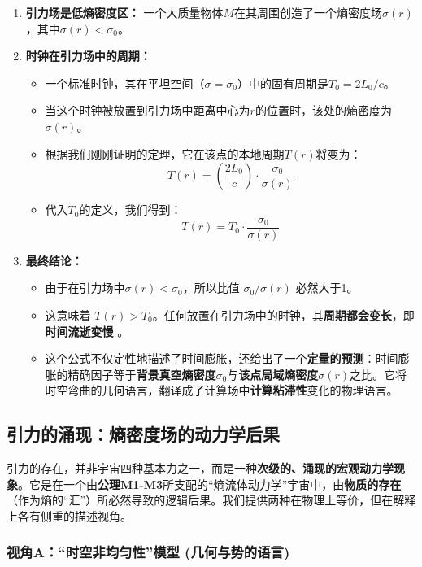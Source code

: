 \documentclass[11pt, a4paper]{article}
\begin{document}
\begin{enumerate}
    \item \textbf{引力场是低熵密度区：} 一个大质量物体$M$在其周围创造了一个熵密度场$\sigma(r)$，其中$\sigma(r) < \sigma_0$。
    \item \textbf{时钟在引力场中的周期：}
    \begin{itemize}
        \item 一个标准时钟，其在平坦空间（$\sigma=\sigma_0$）中的固有周期是$T_0 = 2L_0 / c$。
        \item 当这个时钟被放置到引力场中距离中心为$r$的位置时，该处的熵密度为$\sigma(r)$。
        \item 根据我们刚刚证明的定理，它在该点的本地周期$T(r)$将变为：
        \[
        T(r) = \left(\frac{2L_0}{c}\right) \cdot \frac{\sigma_0}{\sigma(r)}
        \]
        \item 代入$T_0$的定义，我们得到：
        \[
        T(r) = T_0 \cdot \frac{\sigma_0}{\sigma(r)}
        \]
    \end{itemize}
    \item \textbf{最终结论：}
    \begin{itemize}
        \item 由于在引力场中$\sigma(r) < \sigma_0$，所以比值 $\sigma_0 / \sigma(r)$ 必然大于1。
        \item 这意味着 $T(r) > T_0$。任何放置在引力场中的时钟，其\textbf{周期都会变长}，即\textbf{时间流逝变慢} \cite{Einstein1905}。
        \item 这个公式不仅定性地描述了时间膨胀，还给出了一个\textbf{定量的预测}：时间膨胀的精确因子等于\textbf{背景真空熵密度$\sigma_0$}与\textbf{该点局域熵密度$\sigma(r)$}之比。它将时空弯曲的几何语言，翻译成了计算场中\textbf{计算粘滞性}变化的物理语言。
    \end{itemize}
\end{enumerate}


\subsection{引力的涌现：熵密度场的动力学后果}

引力的存在，并非宇宙四种基本力之一，而是一种\textbf{次级的、涌现的宏观动力学现象}。它是在一个由\textbf{公理M1-M3}所支配的“熵流体动力学”宇宙中，由\textbf{物质的存在}（作为熵的“汇”）所必然导致的逻辑后果。我们提供两种在物理上等价，但在解释上各有侧重的描述视角。

\subsubsection*{视角A：“时空非均匀性”模型 (几何与势的语言)}
\end{document}

